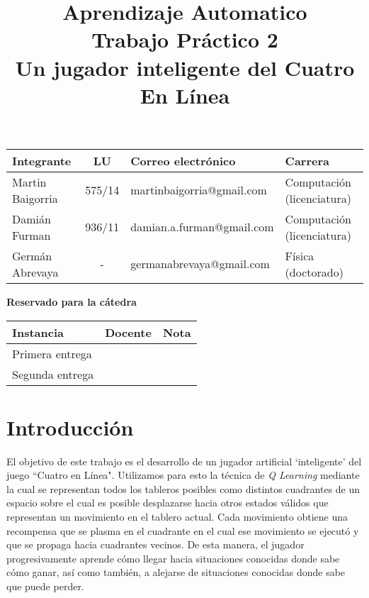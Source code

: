 \documentclass[10pt,a4paper]{article}
\title{Aprendizaje Automatico \\ Trabajo Práctico 2 \\ Un jugador inteligente del Cuatro En Línea }
\begin{document}

\maketitle

\bigskip

\begin{table}[h]
\centering
\begin{tabular}{|l l l l|}
\hline
Integrante       & \multicolumn{1}{c}{LU}     & Correo electrónico              & Carrera \\ \hline
Martin Baigorria & \multicolumn{1}{c}{575/14} & martinbaigorria@gmail.com & Computación (licenciatura) \\
Damián Furman & \multicolumn{1}{c}{936/11}& damian.a.furman@gmail.com & Computación (licenciatura)\\
Germán Abrevaya & \multicolumn{1}{c}{-} & germanabrevaya@gmail.com & Física (doctorado)\\ \hline
\end{tabular}
\end{table}

\vfill

\begin{center}
\textbf{Reservado para la cátedra}
\end{center}
\begin{table}[h]
\centering
\begin{tabular}{|l|l|l|}
\hline
Instancia       & Docente & Nota \\ \hline
Primera entrega &         &      \\ \hline
Segunda entrega &         &      \\ \hline
\end{tabular}
\end{table}

\newpage
\tableofcontents
\newpage


\section{Introducción}

El objetivo de este trabajo es el desarrollo de un jugador artificial `inteligente' del juego ``Cuatro en Línea". Utilizamos para esto la técnica de \textit{Q Learning} mediante la cual se representan todos los tableros posibles como distintos cuadrantes de un espacio sobre el cual es posible desplazarse hacia otros estados válidos que representan un movimiento en el tablero actual. Cada movimiento obtiene una recompensa que se plasma en el cuadrante en el cual ese movimiento se ejecutó y que se propaga hacia cuadrantes vecinos. De esta manera, el jugador progresivamente aprende cómo llegar hacia situaciones conocidas donde sabe cómo ganar, así como también, a alejarse de situaciones conocidas donde sabe que puede perder.
\end{document}
